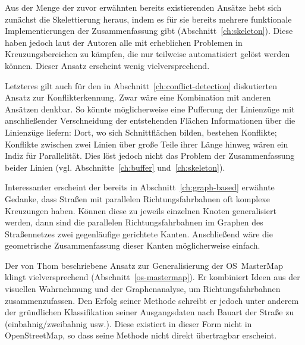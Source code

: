 \documentclass[../main/thesis.tex]{subfiles}
\begin{document}


Aus der Menge der zuvor erwähnten bereits existierenden Ansätze hebt sich zunächst die Skelettierung heraus, indem es für sie bereits mehrere funktionale Implementierungen der Zusammenfassung gibt (Abschnitt~\ref{ch:skeleton}).
Diese haben jedoch laut der Autoren alle mit erheblichen Problemen in Kreuzungsbereichen zu kämpfen, die nur teilweise automatisiert gelöst werden können.
Dieser Ansatz erscheint wenig vielversprechend.

Letzteres gilt auch für den in Abschnitt~\ref{ch:conflict-detection} diskutierten Ansatz zur Konflikterkennung.
Zwar wäre eine Kombination mit anderen Ansätzen denkbar.
So könnte möglicherweise eine Pufferung der Linienzüge mit anschließender Verschneidung der entstehenden Flächen Informationen über die Linienzüge liefern:
Dort, wo sich Schnittflächen bilden, bestehen Konflikte;
Konflikte zwischen zwei Linien über große Teile ihrer Länge hinweg wären ein Indiz für Parallelität.
Dies löst jedoch nicht das Problem der Zusammenfassung beider Linien (vgl. Abschnitte~\ref{ch:buffer} und~\ref{ch:skeleton}).

Interessanter erscheint der bereits in Abschnitt~\ref{ch:graph-based} erwähnte Gedanke, dass Straßen mit parallelen Richtungsfahrbahnen oft komplexe Kreuzungen haben.
Können diese zu jeweils einzelnen Knoten generalisiert werden, dann sind die parallelen Richtungsfahrbahnen im Graphen des Straßennetzes zwei gegenläufige gerichtete Kanten.
Anschließend wäre die geometrische Zusammenfassung dieser Kanten möglicherweise einfach.


Der von Thom beschriebene Ansatz zur Generalisierung der OS~MasterMap klingt vielversprechend (Abschnitt~\ref{os-mastermap}).
Er kombiniert Ideen aus der visuellen Wahrnehmung  und der Graphenanalyse, um Richtungsfahrbahnen zusammenzufassen.
Den Erfolg seiner Methode schreibt er jedoch unter anderem der gründlichen Klassifikation seiner Ausgangsdaten nach Bauart der Straße zu (einbahnig/zweibahnig usw.). 
Diese existiert in dieser Form nicht in OpenStreetMap, so dass seine Methode nicht direkt übertragbar erscheint.
\end{document}
